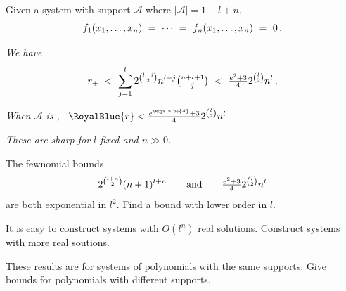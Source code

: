 \documentclass[17pt,landscape]{Narrow}
\newcommand{\DeCo}{\RoyalBlue}
\newcommand{\calA}{{\mathcal A}}
\begin{document}
\begin{flushleft}
\noindent
Given a system with support $\calA$ where $|\calA|=1{+}l{+}n$,\vspace{-8pt}
\[
   f_1(x_1,\dotsc,x_n)\ =\ \dotsb\ =\ f_n(x_1,\dotsc,x_n)\ =\ 0\,.\vspace{-18pt}
\]

\noindent{}
{\sl We have \vspace{-8pt}
\[ 
r_+ \ <\   \sum_{j=1}^l 2^{\binom{l-j}{2}}n^{l-j}\tbinom{n{+}l{+}1}{j}
  \ <\  \tfrac{e^2+3}{4}2^{\binom{l}{2}}n^l\,.\vspace{-18pt}
\]
}

\noindent{}
{\sl When $\calA$ is \DeCo{primitive}, \ $\DeCo{r} < \frac{e^{\DeCo{4}}+3}{4}2^{\binom{l}{2}}n^l$. }


\noindent{}
{\sl These are sharp for $l$ fixed and $n\gg 0$.}

\slide{}
\LogoOn
\begin{center}
\end{center}

The fewnomial bounds\vspace{-8pt}
\[
   2^{\binom{l+n}{2}}(n+1)^{l+n}\qquad\mbox{and}\qquad
\tfrac{e^2+3}{4}2^{\binom{l}{2}}n^l\vspace{-8pt}
\]
are both exponential in $l^2$.\newline
\noindent{}  Find a bound with lower order in $l$.

It is easy to construct systems with $O(l^n)$ real solutions.\newline
\noindent{} Construct systems with more real soutions.

These results are for systems of polynomials with the same supports.\newline
\noindent{} Give bounds for polynomials with different supports.


\slide{}
\LogoOn
\begin{center}
\end{center}


\end{flushleft}
\end{document}
